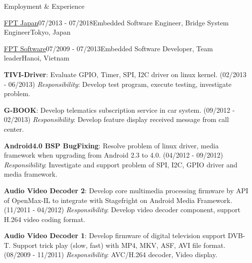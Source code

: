 \documentclass{resume}
\begin{document}
\begin{rSection}{Employment \& Experience}
\begin{rSubsection}{\underline{FPT Japan}}{07/2013 - 07/2018}{Embedded Software Engineer, Bridge System Engineer}{Tokyo, Japan}
    \end{rSubsection}

    \begin{rSubsection}{\underline{FPT Software}}{07/2009 - 07/2013}{Embedded Software Developer, Team leader}{Hanoi, Vietnam}
    \item \textbf{TIVI-Driver}: Evaluate GPIO, Timer, SPI, I2C driver on linux kernel. (02/2013 - 06/2013)
    \newline \textit{Responsibility}: Develop test program, execute testing, investigate problem.

    \item \textbf{G-BOOK}: Develop telematics subscription service in car system. (09/2012 - 02/2013)
    \newline \textit{Responsibility}: Develop feature display received message from call center.

    \item \textbf{Android4.0 BSP BugFixing}: Resolve problem of linux driver, media framework when upgrading from Android 2.3 to 4.0. (04/2012 - 09/2012)
    \newline \textit{Responsibility}: Investigate and support problem of SPI, I2C, GPIO driver and media framework. 

    \item \textbf{Audio Video Decoder 2}: Develop core multimedia processing firmware by API of OpenMax-IL to integrate with Stagefright on Android Media Framework. (11/2011 - 04/2012)
    \newline \textit{Responsibility}: Develop video decoder component, support H.264 video coding format.

    \item \textbf{Audio Video Decoder 1}: Develop firmware of digital television support DVB-T. Support trick play (slow, fast) with MP4, MKV, ASF, AVI file format. (08/2009 - 11/2011)
    \newline \textit{Responsibility}: AVC/H.264 decoder, Video display.
    \end{rSubsection}
  \end{rSection}
\end{document}
